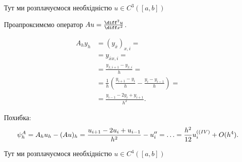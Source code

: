 \begin{solution}
\begin{enumerate}
        Тут ми розплачуємося необхідністю $u \in C^3([a, b])$
    \end{enumerate}
\end{solution}

\begin{example}
    Проапроксимємо оператор $A u = \frac{\diff^2 u}{\diff x^2}$.
\end{example}
\begin{solution}
    \begin{equation}
        \label{eq:4.3.6}
        \begin{aligned}
            A_h y_h &= (y_{\bar{x}})_{x, i} = \\
            &= y_{\bar{x} x, i} = \\
            &= \frac{y_{\bar x, i + 1} - y_{\bar x, i}}{h} = \\
            &= \frac{1}{h} \left( \frac{y_{i + 1} - y_i}{h} - \frac{y_i - y_{i - 1}}{h} \right) = \\
            &= \frac{y_{i - 1} - 2 y_i + y_{i + 1}}{h^2}.
        \end{aligned}
    \end{equation}

    Похибка:
    \begin{equation}
        \label{eq:4.3.7}
        \psi_h^A = A_h u_h - (A u)_h = \frac{u_{i + 1} - 2 u_i + u_{i - 1}}{h^2} - u_i'' = \ldots = \frac{h^2}{12} u_i^{(\text(IV)} + O(h^4).
    \end{equation}

    Тут ми розплачуємося необхідністю $u \in C^4([a, b])$
\end{solution}

